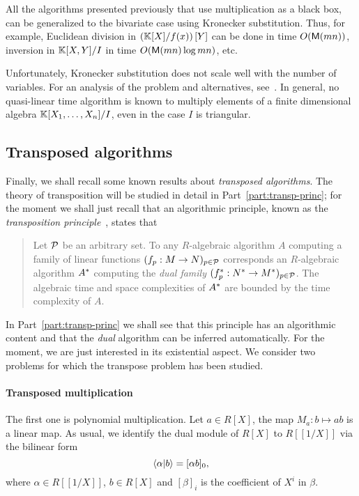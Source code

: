 All the algorithms presented previously that use multiplication as a
black box, can be generalized to the bivariate case using Kronecker
substitution. Thus, for example, Euclidean division in
$\left(\mathbb{K}[X]/f(x)\right)[Y]$ can be done in time $O(\mathsf{M}(mn))$,
inversion in $\mathbb{K}[X,Y]/I$ in time $O(\mathsf{M}(mn)\log mn)$, etc.

  Unfortunately,
Kronecker substitution does not scale well with the number of
variables. For an analysis of the problem and alternatives,
see~\cite{schost05,li+moreno+schost07}. In general, no quasi-linear
time algorithm is known to multiply elements of a finite dimensional
algebra $\mathbb{K}[X_1,\ldots,X_n]/I$, even in the case $I$ is triangular.


\subsection{Transposed algorithms}
\label{sec:transp-algor}
Finally, we shall recall some known results about
\textit{transposed algorithms}. The theory
of transposition will be studied in detail in
Part~\ref{part:transp-princ}; for the moment we shall just recall that
an algorithmic principle, known as the
\textit{transposition
  principle}~\cite{shoup94,shoup95,shoup99,Ka2K,hanrot+quercia+zimmermann,bostan+lecerf+schost:tellegen},
states that
\begin{quote}
  Let $\mathcal{P}$ be an arbitrary set. To any $R$-algebraic algorithm
  $A$ computing a family of linear functions $(f_p:M\rightarrow
  N)_{p\in\mathcal{P}}$ corresponds an $R$-algebraic algorithm $A^\ast$
  computing the \emph{dual family}
  $(f^\ast_p:N^\ast\rightarrow M^\ast)_{p\in\mathcal{P}}$. The algebraic time
  and space complexities of $A^\ast$ are bounded by the time
  complexity of $A$.
\end{quote}

In Part~\ref{part:transp-princ} we shall see that this principle has
an algorithmic content and that the \emph{dual} algorithm can be
inferred automatically. For the moment, we are just interested in its
existential aspect. We consider two problems for which the transpose
problem has been studied.

\paragraph{Transposed multiplication}
\label{sec:transp-mult}
The first one is polynomial
multiplication. Let $a\in R[X]$, the map $M_a:b\mapsto ab$ is a linear
map. As usual, we identify the dual module of $R[X]$ to $R[[1/X]]$ via
the bilinear form
\begin{equation}
  \label{eq:276}
  \left\langle \alpha \middle| b \right\rangle = [\alpha b]_0
  \text{,}
\end{equation}
where $\alpha\in R[[1/X]]$, $b\in R[X]$ and
$[\beta]_i$ is the coefficient of
$X^i$ in $\beta$.

